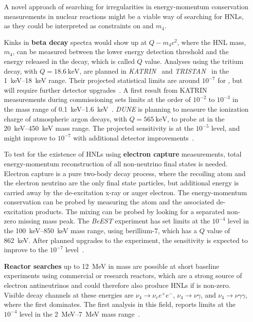 A novel approach of searching for irregularities in energy-momentum conservation measurements in nuclear reactions might be a viable way of searching for HNLs, as they could be interpreted as constraints on  and $m_4$.

Kinks in \textbf{beta decay} spectra would show up at $Q-m_4c^2$, where the HNL mass, $m_4$, can be measured between the lower energy detection threshold and the energy released in the decay, which is called $Q$ value. Analyses using the tritium decay, with $Q=\SI{18.6}{\kilo\electronvolt}$, are planned in \textit{KATRIN}~\cite{KATRIN:2001ttj} and \textit{TRISTAN}~ in the \SIrange{1}{18}{\kilo\electronvolt} range. Their projected statistical limits are around $10^{-7}$ for , but will require further detector upgrades~\cite{Mertens_2019}. A first result from KATRIN measurements during commissioning sets limits at the order of $10^{-2}$ to $10^{-3}$ in the mass range of \SIrange{0.1}{1.6}{\kilo\electronvolt}~. \textit{DUNE} is planning to measure the ionization charge of atmospheric argon decays, with $Q=\SI{565}{\kilo\electronvolt}$, to probe  at in the \SIrange{20}{450}{\kilo\electronvolt} mass range. The projected sensitivity is at the $10^{-5}$ level, and might improve to $10^{-7}$ with additional detector improvements~.

To test for the existence of HNLs using \textbf{electron capture} measurements, total energy-momentum reconstruction of all non-neutrino final states is needed. Electron capture is a pure two-body decay process, where the recoiling atom and the electron neutrino are the only final state particles, but additional energy is carried away by the de-excitation x-ray or auger electron. The energy-momentum conservation can be probed by measuring the atom and the associated de-excitation products. The mixing  can be probed by looking for a separated non-zero missing mass peak. The \textit{BeEST} experiment has set limits at the $10^{-4}$ level in the \SIrange{100}{850}{\kilo\electronvolt} mass range, using berillium-7, which has a $Q$ value of \SI{862}{\kilo\electronvolt}. After planned upgrades to the experiment, the sensitivity is expected to improve to the $10^{-7}$ level~.

\textbf{Reactor searches} up to \SI{12}{\mega\electronvolt} in mass are possible at short baseline experiments using commercial or research reactors, which are a strong source of electron antineutrinos and could therefore also produce HNLs if  is non-zero. Visible decay channels at these energies are $\nu_4 \rightarrow \nu_e e^+ e^-$, $\nu_4 \rightarrow \nu \gamma$, and $\nu_4 \rightarrow \nu \gamma \gamma$, where the first dominates. The first analysis in this field, reports limits at the $10^{-4}$ level in the \SIrange{2}{7}{\mega\electronvolt} mass range~.


